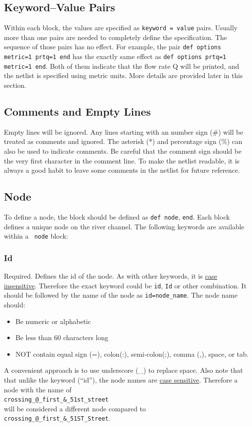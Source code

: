 \documentclass[10pt, letterpaper]{article}
\begin{document}
\subsection{Keyword--Value Pairs}
\label{subsec:kvpair}
Within each block, the values are specified as {\tt keyword = value} pairs. Usually more
than one pairs are needed to completely define the specification. The sequence of those pairs
has no effect. For example, the pair {\tt def options metric=1 prtq=1 end} has the exactly
same effect as {\tt def options prtq=1 metric=1 end}. Both of them indicate that the
flow rate Q will be printed, and the netlist is specified using metric units. More details
are provided later in this section.

\subsection{Comments and Empty Lines}
\label{subsec:comments}
Empty lines will be ignored. Any lines starting with an number sign (\#) will be treated
as comments and ignored. The asterisk (*) and percentage sign (\%) can also be used to
indicate comments. Be careful that the comment sign should be the very first character in
the comment line. To make the netlist readable, it is always a good habit to leave some
comments in the netlist for future reference.

\subsection{Node}
\label{subsec:node}
To define a node, the block should be defined as {\tt def node}, {\tt end}. Each block
defines a unique node on the river channel. The following keywords are available within a {\tt
node} block:

\subsubsection{Id}
\label{subsubsec:id}
Required. Defines the id of the node. As with other keywords, it is \underline{case
  insensitive}. Therefore the exact keyword could be {\tt id}, {\tt Id} or other
combination. It should be followed by the name of the node as {\tt id=node\_name}. The
node name should:
\begin{itemize}
\item{Be numeric or alphabetic}
\item{Be less than 60 characters long}
\item{NOT contain equal sign (=), colon(:), semi-colon(;), comma (,), space, or tab}.
\end{itemize}
A convenient approach is to use underscore (\_) to replace space. Also note that that
unlike the keyword (``id''), the node names are 
\underline{case sensitive}. Therefore a node with the name of \\
{\tt crossing\_@\_first\_\&\_51st\_street}\\
will be considered a different node compared to \\
{\tt crossing\_@\_first\_\&\_51ST\_Street}.
\end{document}
